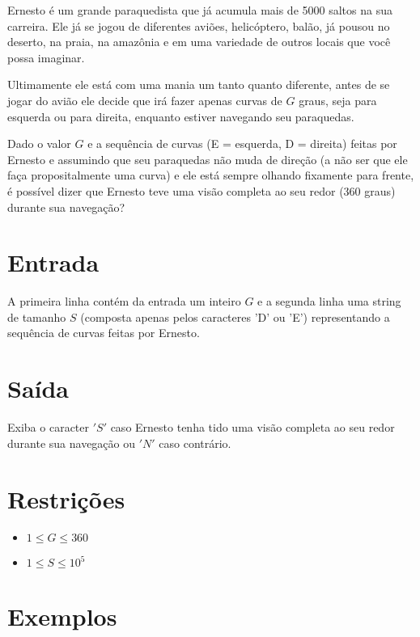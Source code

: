 Ernesto é um grande paraquedista que já acumula mais de 5000 saltos na sua carreira. Ele já se jogou de diferentes aviões, helicóptero, balão, já pousou no deserto, na praia, na amazônia e em uma variedade de outros locais que você possa imaginar. 

Ultimamente ele está com uma mania um tanto quanto diferente, antes de se jogar do avião ele decide que irá fazer apenas curvas de $G$ graus, seja para esquerda ou para direita, enquanto estiver navegando seu paraquedas.

Dado o valor $G$ e a sequência de curvas (E = esquerda, D = direita) feitas por Ernesto e assumindo que seu paraquedas não muda de direção (a não ser que ele faça propositalmente uma curva) e ele está sempre olhando fixamente para frente, é possível dizer que Ernesto teve uma visão completa ao seu redor (360 graus) durante sua navegação?


\section*{Entrada}

A primeira linha contém da entrada um inteiro $G$ e a segunda linha uma string de tamanho $S$ (composta apenas pelos caracteres 'D' ou 'E') representando a sequência de curvas feitas por Ernesto.

\section*{Saída}

Exiba o caracter $'S'$ caso Ernesto tenha tido uma visão completa ao seu redor durante sua navegação ou $'N'$ caso contrário.

\section*{Restrições}

\begin{itemize}
\item $1 \leq G \leq 360$
\item $1 \leq S \leq 10^5$
\end{itemize}

\section*{Exemplos}

\exemplo